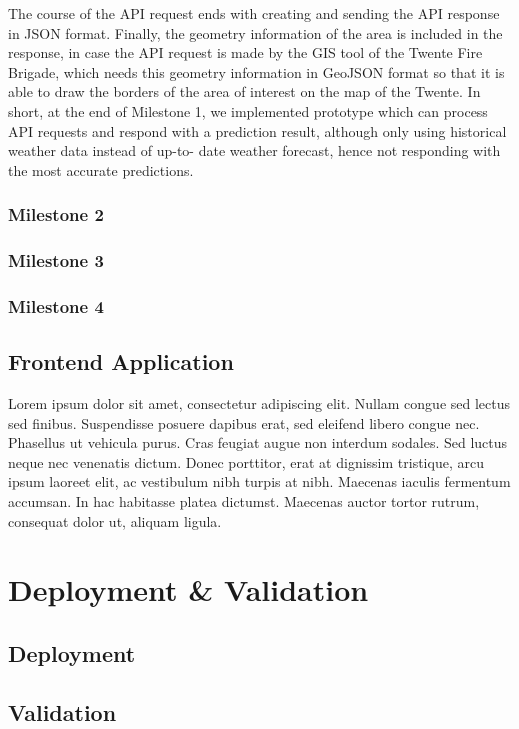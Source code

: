 \documentclass{utitcphd_overleaf}
\begin{document}
The course of the API request ends with creating and sending the API response in JSON format. Finally, the geometry information of the area is included in the response, in case the API request is made by the GIS tool of the Twente Fire Brigade, which needs this geometry information in GeoJSON format so that it is able to draw the borders of the area of interest on the map of the Twente. In short, at the end of Milestone 1, we implemented prototype which can process API requests and respond with a prediction result, although only using historical weather data instead of up-to- date weather forecast, hence not responding with the most accurate predictions.

\subsection{Milestone 2}
\subsection{Milestone 3}
\subsection{Milestone 4}

\section{Frontend Application}

Lorem ipsum dolor sit amet, consectetur adipiscing elit. Nullam congue sed lectus sed finibus. Suspendisse posuere dapibus erat, sed eleifend libero congue nec. Phasellus ut vehicula purus. Cras feugiat augue non interdum sodales. Sed luctus neque nec venenatis dictum. Donec porttitor, erat at dignissim tristique, arcu ipsum laoreet elit, ac vestibulum nibh turpis at nibh. Maecenas iaculis fermentum accumsan. In hac habitasse platea dictumst. Maecenas auctor tortor rutrum, consequat dolor ut, aliquam ligula.

\chapter{Deployment \& Validation}
\label{chap:deployment}

\section{Deployment}

\section{Validation}
\end{document}
